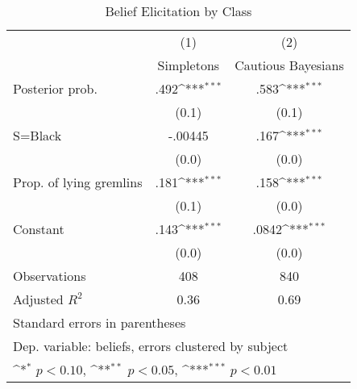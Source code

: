 \begin{table}[htbp]\centering
\def\sym#1{\ifmmode^{#1}\else\(^{#1}\)\fi}
\caption{Belief Elicitation by Class}
\begin{tabular}{l*{2}{c}}
\hline\hline
                &\multicolumn{1}{c}{(1)}&\multicolumn{1}{c}{(2)}\\
                &\multicolumn{1}{c}{Simpletons}&\multicolumn{1}{c}{Cautious Bayesians}\\
\hline
Posterior prob. &     .492\sym{***}&     .583\sym{***}\\
                &    (0.1)         &    (0.1)         \\
S=Black         &  -.00445         &     .167\sym{***}\\
                &    (0.0)         &    (0.0)         \\
Prop. of lying gremlins&     .181\sym{***}&     .158\sym{***}\\
                &    (0.1)         &    (0.0)         \\
Constant        &     .143\sym{***}&    .0842\sym{***}\\
                &    (0.0)         &    (0.0)         \\
\hline
Observations    &      408         &      840         \\
Adjusted \(R^{2}\)&     0.36         &     0.69         \\
\hline\hline
\multicolumn{3}{l}{\footnotesize Standard errors in parentheses}\\
\multicolumn{3}{l}{\footnotesize Dep. variable: beliefs, errors clustered by subject}\\
\multicolumn{3}{l}{\footnotesize \sym{*} \(p<0.10\), \sym{**} \(p<0.05\), \sym{***} \(p<0.01\)}\\
\end{tabular}
\end{table}
